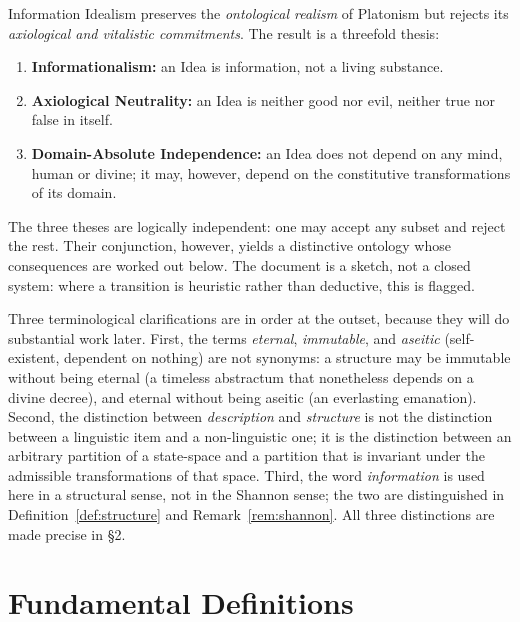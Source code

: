 \documentclass[11pt,a4paper]{article}
\theoremstyle{definition}
\theoremstyle{remark}
\begin{document}
Information Idealism preserves the \emph{ontological realism} of
Platonism but rejects its \emph{axiological and vitalistic
commitments}. The result is a threefold thesis:
\begin{enumerate}[label=(\roman*),nosep]
  \item \textbf{Informationalism:} an Idea is information, not a living
        substance.
  \item \textbf{Axiological Neutrality:} an Idea is neither good nor
        evil, neither true nor false in itself.
  \item \textbf{Domain-Absolute Independence:} an Idea does not depend
        on any mind, human or divine; it may, however, depend on the
        constitutive transformations of its domain.
\end{enumerate}

The three theses are logically independent: one may accept any subset
and reject the rest. Their conjunction, however, yields a distinctive
ontology whose consequences are worked out below. The document is a
sketch, not a closed system: where a transition is heuristic rather
than deductive, this is flagged.

Three terminological clarifications are in order at the outset, because
they will do substantial work later. First, the terms \emph{eternal},
\emph{immutable}, and \emph{aseitic} (self-existent, dependent on
nothing) are not synonyms: a structure may be immutable without being
eternal (a timeless abstractum that nonetheless depends on a divine
decree), and eternal without being aseitic (an everlasting emanation).
Second, the distinction between \emph{description} and
\emph{structure} is not the distinction between a linguistic item and a
non-linguistic one; it is the distinction between an arbitrary
partition of a state-space and a partition that is invariant under the
admissible transformations of that space. Third, the word
\emph{information} is used here in a structural sense, not in the
Shannon sense; the two are distinguished in
Definition~\ref{def:structure} and Remark~\ref{rem:shannon}. All three
distinctions are made precise in \S2.

\section{Fundamental Definitions}
\end{document}
